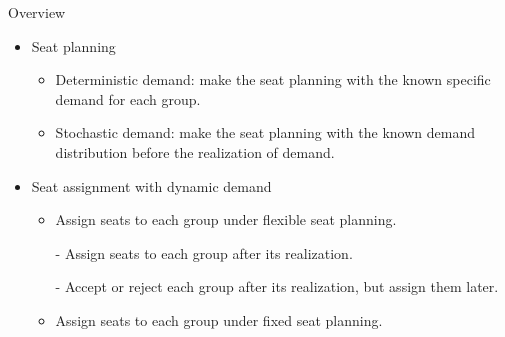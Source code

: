    \begin{frame}{Overview}
      \begin{itemize}
        \item Seat planning
        \vspace*{0.2cm}
        \begin{itemize}
          \item {\color{red}Deterministic demand}: make the seat planning with the known specific demand for each group.
          \item {\color{red}Stochastic demand}: make the seat planning with the known demand distribution before the realization of demand.
        \end{itemize}
        
        \item Seat assignment with dynamic demand
        
        \begin{itemize}
          \vspace*{0.2cm}
          \item Assign seats to each group under {\color{red}flexible} seat planning.
          \vspace*{0.2cm}
            \item[-] Assign seats to each group after its realization.
            \item[-] Accept or reject each group after its realization, but assign them later.
          \vspace*{0.2cm}
          \item Assign seats to each group under {\color{red}fixed} seat planning.
        \end{itemize}
      \end{itemize}
    \end{frame}